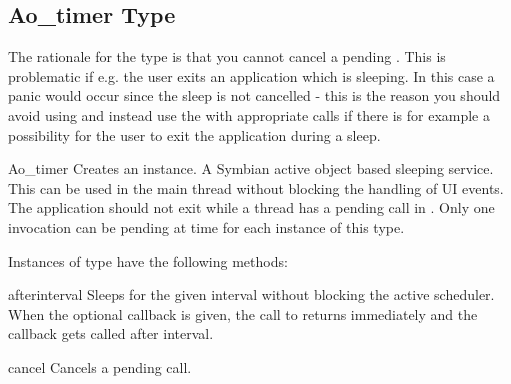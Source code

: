 \subsection{Ao_timer Type}
\label{subsec:Aotimer}

The rationale for the  type is that you cannot cancel a 
pending . This is problematic if e.g. the user exits 
an application which is sleeping. In this case a panic would occur since the 
sleep is not cancelled - this is the reason you should avoid using 
 and instead use the  with 
appropriate  calls if there is for example a possibility for 
the user to exit the application during a sleep.

\begin{classdesc}{Ao_timer}{}
Creates an  instance. A Symbian active object based 
sleeping service. This can be used in the main thread without blocking the 
handling of UI events. The application should not exit while a thread has a 
pending  call in . Only one  
invocation can be pending at time for each instance of this type.
\end{classdesc}

Instances of  type have the following methods:

\begin{methoddesc}[Ao_timer]{after}{interval }
Sleeps for the given interval without blocking the active scheduler. When 
the optional callback is given, the call to  returns 
immediately and the callback gets called after interval.
\end{methoddesc}

\begin{methoddesc}[Ao_timer]{cancel}{}
Cancels a pending  call.
\end{methoddesc}
